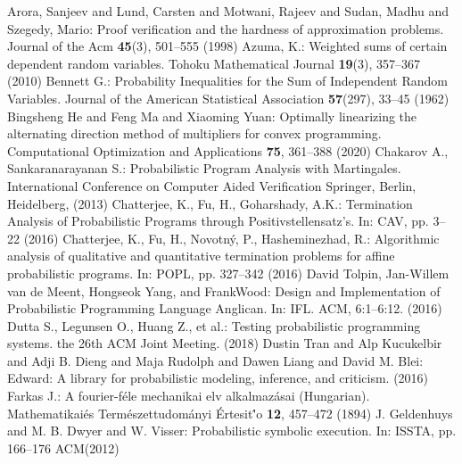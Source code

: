 \documentclass[runningheads]{llncs}
\begin{document}
%
%
%
% 
% 
%
\begin{thebibliography}{8}
Arora, Sanjeev and Lund, Carsten and Motwani, Rajeev and Sudan, Madhu and Szegedy, Mario: Proof verification and the hardness of approximation problems. Journal of the Acm \textbf{45}(3), 501--555 (1998)
Azuma, K.: Weighted sums of certain dependent random variables. Tohoku Mathematical Journal \textbf{19}(3), 357--367 (2010)
Bennett G.: Probability Inequalities for the Sum of Independent Random Variables. Journal of the American Statistical Association \textbf{57}(297), 33--45 (1962)
Bingsheng He and Feng Ma and Xiaoming Yuan: Optimally linearizing the alternating direction method of multipliers for convex programming. Computational Optimization and Applications \textbf{75}, 361--388 (2020)
Chakarov A., Sankaranarayanan S.: Probabilistic Program Analysis with Martingales. International Conference on Computer Aided Verification Springer, Berlin, Heidelberg, (2013)
Chatterjee, K., Fu, H., Goharshady, A.K.: Termination Analysis of Probabilistic Programs through Positivstellensatz's. In: CAV, pp. 3--22 (2016)
Chatterjee, K., Fu, H., Novotn\'{y}, P., Hasheminezhad, R.: Algorithmic analysis of
qualitative and quantitative termination problems for affine probabilistic programs. In: POPL, pp. 327--342 (2016)
David Tolpin, Jan-Willem van de Meent, Hongseok Yang, and FrankWood: Design and Implementation of Probabilistic Programming Language Anglican. In: IFL. ACM, 6:1–6:12. (2016)
Dutta S., Legunsen O., Huang Z., et al.: Testing probabilistic programming systems. the 26th ACM Joint Meeting. (2018)
Dustin Tran and Alp Kucukelbir and Adji B. Dieng and Maja Rudolph and Dawen Liang and David M. Blei: Edward: A library for probabilistic modeling, inference, and criticism. (2016) 
Farkas J.: A fourier-f\'{e}le mechanikai elv alkalmaz\'{a}sai (Hungarian). Mathematikai\'{e}s Term\'{e}szettudom\'{a}nyi \'{E}rtesit\''{o} \textbf{12}, 457--472 (1894)
J. Geldenhuys and M. B. Dwyer and W. Visser: Probabilistic symbolic execution. In: ISSTA, pp. 166--176 ACM(2012)

\end{thebibliography}
\end{document}
